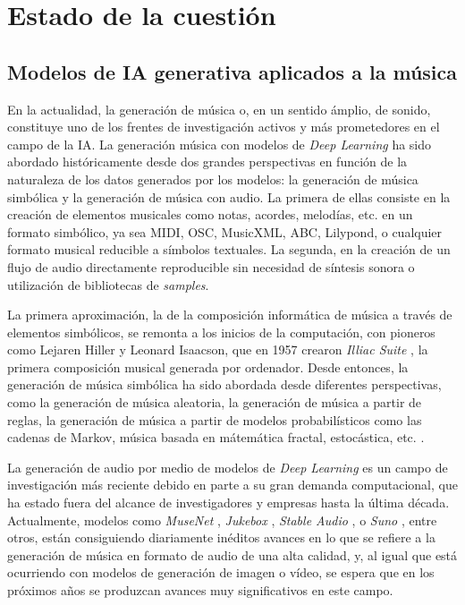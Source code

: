 \chapter{Estado de la cuestión}
\label{chap:estado_cuestion}

\section{Modelos de IA generativa aplicados a la música}

En la actualidad, la generación de música o, en un sentido ámplio, de sonido, constituye uno de los frentes de investigación activos y más prometedores en el campo de la IA. La generación música con modelos de \textit{Deep Learning} ha sido abordado históricamente desde dos grandes perspectivas en función de la naturaleza de los datos generados por los modelos: la generación de música simbólica y la generación de música con audio. La primera de ellas consiste en la creación de elementos musicales como notas, acordes, melodías, etc. en un formato simbólico, ya sea MIDI, OSC, MusicXML, ABC, Lilypond, o cualquier formato musical reducible a símbolos textuales. La segunda, en la creación de un flujo de audio directamente reproducible sin necesidad de síntesis sonora o utilización de bibliotecas de \textit{samples}.

La primera aproximación, la de la composición informática de música a través de elementos simbólicos, se remonta a los inicios de la computación, con pioneros como Lejaren Hiller y Leonard Isaacson, que en 1957 crearon \textit{Illiac Suite} \citep{arizaTwoPioneeringProjects2011,funkMusicalSuiteComposed2018}, la primera composición musical generada por ordenador. Desde entonces, la generación de música simbólica ha sido abordada desde diferentes perspectivas, como la generación de música aleatoria, la generación de música a partir de reglas, la generación de música a partir de modelos probabilísticos como las cadenas de Markov, música basada en mátemática fractal, estocástica, etc. \citep{hernandez-olivanSurveyArtificialIntelligence2022}. 

La generación de audio por medio de modelos de \textit{Deep Learning} es un campo de investigación más reciente debido en parte a su gran demanda computacional, que ha estado fuera del alcance de investigadores y empresas hasta la última década. Actualmente, modelos como \textit{MuseNet}  \citep{departmentofcomputersciencesrminstituteofscienceandtechnologychennaiindia.MusenetMusicGeneration2020a}, \textit{Jukebox} \citep{dhariwalJukeboxGenerativeModel2020}, \textit{Stable Audio} \cite{StableAudioFast}, o \textit{Suno} \citep{SunoAI}, entre otros, están consiguiendo diariamente inéditos avances en lo que se refiere a la generación de música en formato de audio de una alta calidad, y, al igual que está ocurriendo con modelos de generación de imagen o vídeo, se espera que en los próximos años se produzcan avances muy significativos en este campo. 


